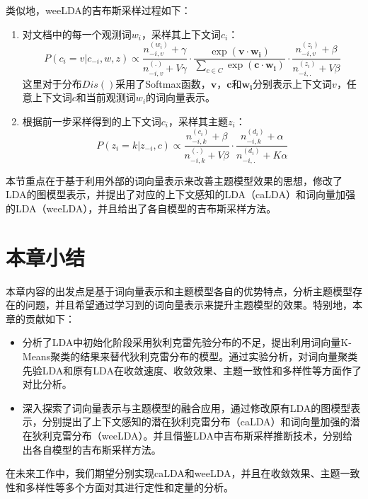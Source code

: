 \documentclass[master]{njuthesis}
\begin{document}
类似地，weeLDA的吉布斯采样过程如下：
	\begin{enumerate}
	\item 	对文档中的每一个观测词$w_i$，采样其上下文词$c_i$：
			\begin{equation}\label{eq:caLDA_gb_c_chap5}
			P(c_i=v|c_{-i}, w, z)\propto \frac{n_{-i, v}^{(w_i)}+\gamma}{n_{-i, v}^{(.)}+V\gamma}\cdot \frac{\exp(\mathbf{v} \cdot \mathbf{w_{i}})}{\sum_{c\in C}\exp(\mathbf{c} \cdot \mathbf{w_{i}})} \cdot \frac{n_{-i, v}^{(z_i)}+\beta}{n_{-i, .}^{(z_i)}+V\beta}
			\end{equation}
			这里对于分布$Dis()$采用了Softmax函数，$\mathbf{v}$，$\mathbf{c}$和$\mathbf{w_i}$分别表示上下文词$v$，任意上下文词$c$和当前观测词$w_i$的词向量表示。
	\item 	根据前一步采样得到的上下文词$c_i$，采样其主题$z_i$：
			\begin{equation}\label{eq:caLDA_gb_z_chap5}
			P(z_i=k|z_{-i}, c)\propto \frac{n_{-i, k}^{(c_i)}+\beta}{n_{-i, k}^{(.)}+V\beta}\cdot \frac{n_{-i, k}^{(d_i)}+\alpha}{n_{-i, .}^{(d_i)}+K\alpha}
			\end{equation}
	\end{enumerate}
	
本节重点在于基于利用外部的词向量表示来改善主题模型效果的思想，修改了LDA的图模型表示，并提出了对应的上下文感知的LDA（caLDA）和词向量加强的LDA（weeLDA），并且给出了各自模型的吉布斯采样方法。


\section{本章小结}\label{sec_conclusions_chap5}

本章内容的出发点是基于词向量表示和主题模型各自的优势特点，分析主题模型存在的问题，并且希望通过学习到的词向量表示来提升主题模型的效果。特别地，本章的贡献如下：

\begin{itemize}
\item 分析了LDA中初始化阶段采用狄利克雷先验分布的不足，提出利用词向量K-Means聚类的结果来替代狄利克雷分布的模型。通过实验分析，对词向量聚类先验LDA和原有LDA在收敛速度、收敛效果、主题一致性和多样性等方面作了对比分析。
\item 深入探索了词向量表示与主题模型的融合应用，通过修改原有LDA的图模型表示，分别提出了上下文感知的潜在狄利克雷分布（caLDA）和词向量加强的潜在狄利克雷分布（weeLDA）。并且借鉴LDA中吉布斯采样推断技术，分别给出各自模型的吉布斯采样方法。
\end{itemize}

在未来工作中，我们期望分别实现caLDA和weeLDA，并且在收敛效果、主题一致性和多样性等多个方面对其进行定性和定量的分析。
\end{document}
